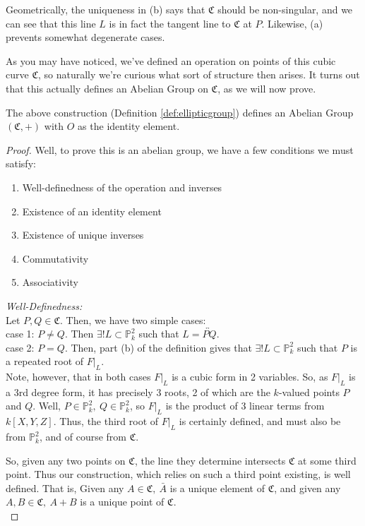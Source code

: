 Geometrically, the uniqueness in (b) says that $\mathfrak{C}$ should be non-singular,
and we can see that this line $L$ is in fact the tangent line to $\mathfrak{C}$ at $P$.
Likewise, (a) prevents somewhat degenerate cases.

As you may have noticed, we've defined an operation on points of this
cubic curve $\mathfrak{C}$, so naturally we're curious what sort of structure then
arises. It turns out that this actually defines an Abelian Group on $\mathfrak{C}$,
as we will now prove.

\begin{theorem}
The above construction (Definition \ref{def:ellipticgroup}) defines
an Abelian Group $(\mathfrak{C},+)$ with $O$ as the identity element.
\end{theorem}

\begin{proof}
Well, to prove this is an abelian group, we have a few conditions we must satisfy:
\begin{enumerate}
\item Well-definedness of the operation and inverses
\item Existence of an identity element
\item Existence of unique inverses
\item Commutativity
\item Associativity
\end{enumerate}

\emph{Well-Definedness:}\\
Let $P, Q \in \mathfrak{C}$. Then, we have two simple cases:\\

case 1:  $P \ne Q$. Then $\exists! L \subset \mathbb{P}^2_k$ such that $L = \overleftrightarrow{PQ}$.\\

case 2: $P = Q$. Then, part (b) of the definition gives that $\exists! L \subset \mathbb{P}^2_k$ such that
$P$ is a repeated root of $F|_L$.\\

Note, however, that in both cases $F|_L$ is a cubic form in 2 variables.
So, as $F|_L$ is a 3rd degree form, it has precisely 3 roots, 2 of which
are the $k$-valued points $P$ and $Q$. Well, $P \in \mathbb{P}^2_k,~Q\in \mathbb{P}^2_k$,
so $F|_L$ is the product of 3 linear terms from $k[X,Y,Z]$. Thus, the
third root of $F|_L$ is certainly defined, and must also be from $\mathbb{P}^2_k$, and of course from $\mathfrak{C}$.

So, given any two points on $\mathfrak{C}$, the line they determine intersects $\mathfrak{C}$ at some third point.
Thus our construction, which relies on such a third point existing, is well defined. That is,
Given any $A \in \mathfrak{C},~\bar{A}$ is a unique element of $\mathfrak{C}$, and given any $A, B \in \mathfrak{C},~A+B$ 
is a unique point of $\mathfrak{C}$.\\


\end{proof}

